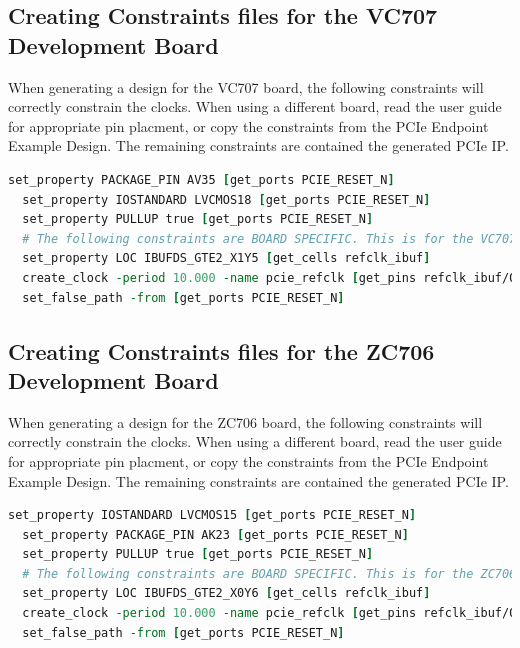 \documentclass{refrep}
\newcommand{\Xilinx}[1]{{\color{red}{#1}}}
\begin{document}
\subsection{Creating Constraints files for the VC707 Development Board}
\label{Sec:7SeriesIntegrated:Generating:Constraints:VC707}
When generating a design for the VC707 board, the following constraints will
correctly constrain the clocks. When using a different board, read the user
guide for appropriate pin placment, or copy the constraints from the PCIe
Endpoint Example Design. The remaining constraints are contained the generated PCIe IP.
\begin{lstlisting}[basicstyle=\footnotesize\ttfamily,language=tcl,
    commentstyle=\color{red},label=Listing:7SeriesIntegrated:Generating:Constraints:VC707,
    caption=\Xilinx{.xdc} constraints for the VC707 board,frame=single]
  set_property PACKAGE_PIN AV35 [get_ports PCIE_RESET_N]
  set_property IOSTANDARD LVCMOS18 [get_ports PCIE_RESET_N]
  set_property PULLUP true [get_ports PCIE_RESET_N]
  # The following constraints are BOARD SPECIFIC. This is for the VC707
  set_property LOC IBUFDS_GTE2_X1Y5 [get_cells refclk_ibuf]
  create_clock -period 10.000 -name pcie_refclk [get_pins refclk_ibuf/O]
  set_false_path -from [get_ports PCIE_RESET_N]
\end{lstlisting}

\subsection{Creating Constraints files for the ZC706 Development Board}
\label{Sec:7SeriesIntegrated:Generating:Constraints:ZC706}
When generating a design for the ZC706 board, the following constraints will
correctly constrain the clocks. When using a different board, read the user
guide for appropriate pin placment, or copy the constraints from the PCIe
Endpoint Example Design. The remaining constraints are contained the generated PCIe IP.
\begin{lstlisting}[basicstyle=\footnotesize\ttfamily,language=tcl,
    commentstyle=\color{red},label=Listing:7SeriesIntegrated:Generating:Constraints:ZC706,
    caption=\Xilinx{.xdc} constraints for the ZC706 board,frame=single]
  set_property IOSTANDARD LVCMOS15 [get_ports PCIE_RESET_N]
  set_property PACKAGE_PIN AK23 [get_ports PCIE_RESET_N]
  set_property PULLUP true [get_ports PCIE_RESET_N]
  # The following constraints are BOARD SPECIFIC. This is for the ZC706
  set_property LOC IBUFDS_GTE2_X0Y6 [get_cells refclk_ibuf]
  create_clock -period 10.000 -name pcie_refclk [get_pins refclk_ibuf/O]
  set_false_path -from [get_ports PCIE_RESET_N]
\end{lstlisting}
\end{document}
